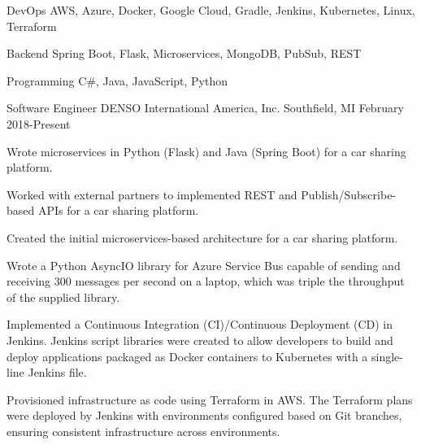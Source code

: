 \documentclass[11pt, a4paper]{awesome-cv}
\begin{document}
\makecvheader[C]


\begin{cvskills}
    \cvskill
    {DevOps}
    {AWS, Azure, Docker, Google Cloud, Gradle, Jenkins, Kubernetes, Linux, Terraform}

    \cvskill
    {Backend}
    {Spring Boot, Flask, Microservices, MongoDB, PubSub, REST}

    \cvskill
    {Programming}
    {C\#, Java, JavaScript, Python}
\end{cvskills}

\begin{cventries}
    \cventry
    {Software Engineer}
    {DENSO International America, Inc.}
    {Southfield, MI}
    {February 2018-Present}
    {
        \begin{cvitems}
            \item{Wrote microservices in Python (Flask) and Java (Spring Boot) for a car sharing platform.}
            \item{Worked with external partners to implemented REST and Publish/Subscribe-based APIs for a car sharing platform.}
            \item{Created the initial microservices-based architecture for a car sharing platform.}
            \item{Wrote a Python AsyncIO library for Azure Service Bus capable of sending and receiving 300 messages per second on a laptop, which was triple the throughput of the supplied library.}
            \item{Implemented a Continuous Integration (CI)/Continuous Deployment (CD) in Jenkins. Jenkins script libraries were created to allow developers to build and deploy applications packaged as Docker containers to Kubernetes with a single-line Jenkins file.}
            \item{Provisioned infrastructure as code using Terraform in AWS. The Terraform plans were deployed by Jenkins with environments configured based on Git branches, ensuring consistent infrastructure across environments.}
        \end{cvitems}
    }


\end{cventries}
\end{document}
